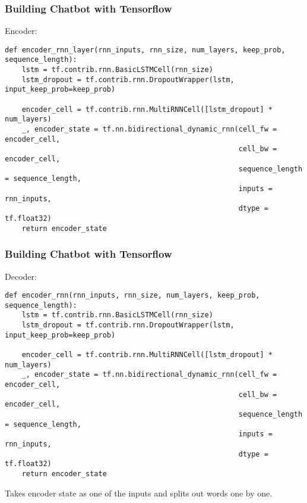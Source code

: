 \begin{frame}[fragile]\frametitle{Building Chatbot with Tensorflow}
Encoder:
\begin{lstlisting}
def encoder_rnn_layer(rnn_inputs, rnn_size, num_layers, keep_prob, sequence_length):
    lstm = tf.contrib.rnn.BasicLSTMCell(rnn_size)
    lstm_dropout = tf.contrib.rnn.DropoutWrapper(lstm, input_keep_prob=keep_prob)
    
    encoder_cell = tf.contrib.rnn.MultiRNNCell([lstm_dropout] * num_layers)
    _, encoder_state = tf.nn.bidirectional_dynamic_rnn(cell_fw = encoder_cell,
                                                       cell_bw = encoder_cell,
                                                       sequence_length = sequence_length,
                                                       inputs = rnn_inputs,
                                                       dtype = tf.float32)
    return encoder_state
\end{lstlisting}

\end{frame}

\begin{frame}[fragile]\frametitle{Building Chatbot with Tensorflow}
Decoder:
\begin{lstlisting}
def encoder_rnn(rnn_inputs, rnn_size, num_layers, keep_prob, sequence_length):
    lstm = tf.contrib.rnn.BasicLSTMCell(rnn_size)
    lstm_dropout = tf.contrib.rnn.DropoutWrapper(lstm, input_keep_prob=keep_prob)
    
    encoder_cell = tf.contrib.rnn.MultiRNNCell([lstm_dropout] * num_layers)
    _, encoder_state = tf.nn.bidirectional_dynamic_rnn(cell_fw = encoder_cell,
                                                       cell_bw = encoder_cell,
                                                       sequence_length = sequence_length,
                                                       inputs = rnn_inputs,
                                                       dtype = tf.float32)
    return encoder_state
\end{lstlisting}
Takes encoder state as one of the inputs and splits out words one by one.
\end{frame}

